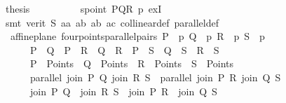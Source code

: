 \begin{isabellebody}
\ {\isacharquery}{\kern0pt}thesis\isanewline
\ \ \ \ \ \ \ \ \isamarkupfalse%
\ spoint\ PQR\ p{}\ exI\ \isanewline
\ \ \ \ \ \ \isamarkupfalse%
\ {\isacharparenleft}{\kern0pt}smt\ {\isacharparenleft}{\kern0pt}verit{\isacharparenright}{\kern0pt}\ S\ a{}a\ a{}b\ a{}b\ a{}c\ collinear{\isacharunderscore}{\kern0pt}def\ parallel{\isacharunderscore}{\kern0pt}def{\isacharparenright}{\kern0pt}\isanewline
\ \ \ \ \isamarkupfalse%
%
\endisatagproof
{\isafoldproof}%
%
\isadelimproof
\isanewline
%
\endisadelimproof
\isanewline
\isanewline
{}\isamarkupfalse%
\ {\isacharparenleft}{\kern0pt}\ affine{\isacharunderscore}{\kern0pt}plane{\isacharparenright}{\kern0pt}\ four{\isacharunderscore}{\kern0pt}points{\isacharunderscore}{\kern0pt}parallel{\isacharunderscore}{\kern0pt}pairs{\isacharcolon}{\kern0pt}\ {\isachardoublequoteopen}{\isasymexists}{\isacharparenleft}{\kern0pt}P\ {\isacharcolon}{\kern0pt}{\isacharcolon}{\kern0pt}\ {\isacharprime}{\kern0pt}p{\isacharparenright}{\kern0pt}\ {\isacharparenleft}{\kern0pt}Q\ {\isacharcolon}{\kern0pt}{\isacharcolon}{\kern0pt}\ {\isacharprime}{\kern0pt}p{\isacharparenright}{\kern0pt}\ {\isacharparenleft}{\kern0pt}R\ {\isacharcolon}{\kern0pt}{\isacharcolon}{\kern0pt}\ {\isacharprime}{\kern0pt}p{\isacharparenright}{\kern0pt}\ {\isacharparenleft}{\kern0pt}S\ {\isacharcolon}{\kern0pt}{\isacharcolon}{\kern0pt}\ {\isacharprime}{\kern0pt}p{\isacharparenright}{\kern0pt}{\isachardot}{\kern0pt}\ \isanewline
\ \ \ \ \ \ P\ {\isasymnoteq}\ Q\ {\isasymand}\ P\ {\isasymnoteq}\ R\ {\isasymand}\ Q\ {\isasymnoteq}\ R\ {\isasymand}\ P\ {\isasymnoteq}\ S\ {\isasymand}\ Q\ {\isasymnoteq}\ S\ {\isasymand}\ R\ {\isasymnoteq}\ S\ {\isasymand}\ \isanewline
\ \ \ \ \ \ P\ {\isasymin}\ Points\ {\isasymand}\ Q\ {\isasymin}\ Points\ {\isasymand}\ R\ {\isasymin}\ Points\ {\isasymand}\ S\ {\isasymin}\ Points\ {\isasymand}\ \isanewline
\ \ \ \ \ \ parallel\ {\isacharparenleft}{\kern0pt}join\ P\ Q{\isacharparenright}{\kern0pt}\ {\isacharparenleft}{\kern0pt}join\ R\ S{\isacharparenright}{\kern0pt}\ {\isasymand}\ parallel\ {\isacharparenleft}{\kern0pt}join\ P\ R{\isacharparenright}{\kern0pt}\ {\isacharparenleft}{\kern0pt}join\ Q\ S{\isacharparenright}{\kern0pt}\ {\isasymand}\ \isanewline
\ \ \ \ \ \ {\isacharparenleft}{\kern0pt}join\ P\ Q{\isacharparenright}{\kern0pt}\ {\isasymnoteq}\ {\isacharparenleft}{\kern0pt}join\ R\ S{\isacharparenright}{\kern0pt}\ {\isasymand}\ {\isacharparenleft}{\kern0pt}join\ P\ R{\isacharparenright}{\kern0pt}\ {\isasymnoteq}\ {\isacharparenleft}{\kern0pt}join\ Q\ S{\isacharparenright}{\kern0pt}\ {\isasymand}\ \isanewline

\end{isabellebody}
